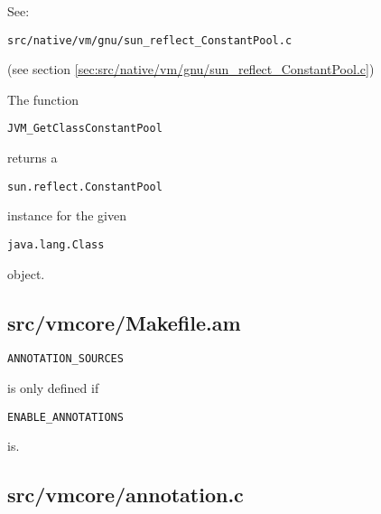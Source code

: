 \documentclass[a4paper, 10pt, titlepage]{scrartcl} %
\begin{document}
See: \begin{scriptsize}\verb|src|\hspace{0.0pt}\verb|/|\hspace{0.0pt}\verb|native|\hspace{0.0pt}\verb|/|\hspace{0.0pt}\verb|vm|\hspace{0.0pt}\verb|/|\hspace{0.0pt}\verb|gnu|\hspace{0.0pt}\verb|/|\hspace{0.0pt}\verb|sun_reflect_ConstantPool|\hspace{0.0pt}\verb|.|\hspace{0.0pt}\verb|c|\end{scriptsize} (see section \ref{sec:src/native/vm/gnu/sun_reflect_ConstantPool.c})

The function \begin{scriptsize}\verb|JVM_GetClassConstantPool|\end{scriptsize} returns a \begin{scriptsize}\verb|sun|\hspace{0.0pt}\verb|.|\hspace{0.0pt}\verb|reflect|\hspace{0.0pt}\verb|.|\hspace{0.0pt}\verb|ConstantPool|\end{scriptsize}
instance for the given \begin{scriptsize}\verb|java|\hspace{0.0pt}\verb|.|\hspace{0.0pt}\verb|lang|\hspace{0.0pt}\verb|.|\hspace{0.0pt}\verb|Class|\end{scriptsize} object.

\subsection{src/vmcore/Makefile.am}
\label{sec:src/vmcore/Makefile.am}

\begin{scriptsize}\verb|ANNOTATION_SOURCES|\end{scriptsize} is only defined if \begin{scriptsize}\verb|ENABLE_ANNOTATIONS|\end{scriptsize} is.

\subsection{src/vmcore/annotation.c}
\label{sec:src/vmcore/annotation.c}
\end{document}
